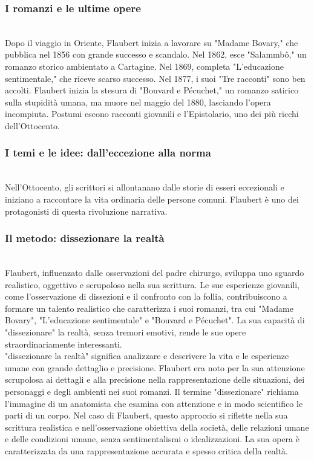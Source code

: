 \documentclass{report}
\begin{document}
\subsubsection{I  romanzi  e  le  ultime  opere}
\\
Dopo il viaggio in Oriente, Flaubert inizia a lavorare su "Madame Bovary," che pubblica nel 1856 con grande successo e scandalo. Nel 1862, esce "Salammbô," un romanzo storico ambientato a Cartagine. Nel 1869, completa "L'educazione sentimentale," che riceve scarso successo. Nel 1877, i suoi "Tre racconti" sono ben accolti. Flaubert inizia la stesura di "Bouvard e Pécuchet," un romanzo satirico sulla stupidità umana, ma muore nel maggio del 1880, lasciando l'opera incompiuta. Postumi escono racconti giovanili e l'Epistolario, uno dei più ricchi dell'Ottocento.
\\
\subsubsection{I temi e le idee: dall’eccezione alla norma}
\\
Nell'Ottocento, gli scrittori si allontanano dalle storie di esseri eccezionali e iniziano a raccontare la vita ordinaria delle persone comuni. Flaubert è uno dei protagonisti di questa rivoluzione narrativa.
\\
\subsubsection{Il metodo: dissezionare la realtà}
\\
Flaubert, influenzato dalle osservazioni del padre chirurgo, sviluppa uno sguardo realistico, oggettivo e scrupoloso nella sua scrittura. Le sue esperienze giovanili, come l'osservazione di dissezioni e il confronto con la follia, contribuiscono a formare un talento realistico che caratterizza i suoi romanzi, tra cui "Madame Bovary", "L'educazione sentimentale" e "Bouvard e Pécuchet". La sua capacità di "dissezionare" la realtà, senza tremori emotivi, rende le sue opere straordinariamente interessanti.
\\
"dissezionare la realtà" significa analizzare e descrivere la vita e le esperienze umane con grande dettaglio e precisione. Flaubert era noto per la sua attenzione scrupolosa ai dettagli e alla precisione nella rappresentazione delle situazioni, dei personaggi e degli ambienti nei suoi romanzi. Il termine "dissezionare" richiama l'immagine di un anatomista che esamina con attenzione e in modo scientifico le parti di un corpo. Nel caso di Flaubert, questo approccio si riflette nella sua scrittura realistica e nell'osservazione obiettiva della società, delle relazioni umane e delle condizioni umane, senza sentimentalismi o idealizzazioni. La sua opera è caratterizzata da una rappresentazione accurata e spesso critica della realtà.
\\
\end{document}
